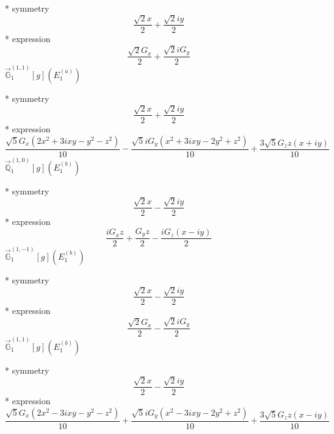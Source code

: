 \documentclass[fleqn,8pt]{jsarticle}
\begin{document}
\noindent\quad ** symmetry
\begin{dmath*}
\frac{\sqrt{2} x}{2} + \frac{\sqrt{2} i y}{2}
\end{dmath*}
\noindent\quad ** expression
\begin{dmath*}
\frac{\sqrt{2} G_{x}}{2} + \frac{\sqrt{2} i G_{y}}{2}
\end{dmath*}
\noindent\quad $\vec{\mathbb{G}}_{1}^{(1,1)}[g](E_{1}^{(a)})$

\noindent\quad ** symmetry
\begin{dmath*}
\frac{\sqrt{2} x}{2} + \frac{\sqrt{2} i y}{2}
\end{dmath*}
\noindent\quad ** expression
\begin{dmath*}
\frac{\sqrt{5} G_{x} \left(2 x^{2} + 3 i x y - y^{2} - z^{2}\right)}{10} - \frac{\sqrt{5} i G_{y} \left(x^{2} + 3 i x y - 2 y^{2} + z^{2}\right)}{10} + \frac{3 \sqrt{5} G_{z} z \left(x + i y\right)}{10}
\end{dmath*}
\noindent\quad $\vec{\mathbb{Q}}_{1}^{(1,0)}[g](E_{1}^{(b)})$

\noindent\quad ** symmetry
\begin{dmath*}
\frac{\sqrt{2} x}{2} - \frac{\sqrt{2} i y}{2}
\end{dmath*}
\noindent\quad ** expression
\begin{dmath*}
\frac{i G_{x} z}{2} + \frac{G_{y} z}{2} - \frac{i G_{z} \left(x - i y\right)}{2}
\end{dmath*}
\noindent\quad $\vec{\mathbb{G}}_{1}^{(1,-1)}[g](E_{1}^{(b)})$

\noindent\quad ** symmetry
\begin{dmath*}
\frac{\sqrt{2} x}{2} - \frac{\sqrt{2} i y}{2}
\end{dmath*}
\noindent\quad ** expression
\begin{dmath*}
\frac{\sqrt{2} G_{x}}{2} - \frac{\sqrt{2} i G_{y}}{2}
\end{dmath*}
\noindent\quad $\vec{\mathbb{G}}_{1}^{(1,1)}[g](E_{1}^{(b)})$

\noindent\quad ** symmetry
\begin{dmath*}
\frac{\sqrt{2} x}{2} - \frac{\sqrt{2} i y}{2}
\end{dmath*}
\noindent\quad ** expression
\begin{dmath*}
\frac{\sqrt{5} G_{x} \left(2 x^{2} - 3 i x y - y^{2} - z^{2}\right)}{10} + \frac{\sqrt{5} i G_{y} \left(x^{2} - 3 i x y - 2 y^{2} + z^{2}\right)}{10} + \frac{3 \sqrt{5} G_{z} z \left(x - i y\right)}{10}
\end{dmath*}
\end{document}
